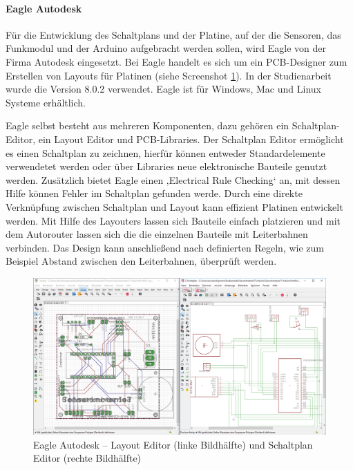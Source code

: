 \paragraph{Eagle Autodesk} Für die Entwicklung des Schaltplans und der Platine, auf der die Sensoren,  das Funkmodul und der Arduino aufgebracht werden sollen, wird Eagle von der Firma Autodesk eingesetzt.  Bei Eagle handelt es sich um ein \ac{PCB}-Designer zum Erstellen von Layouts für Platinen (siehe Screenshot \ref{img:EagleAutodesk}). In der Studienarbeit wurde die Version 8.0.2 verwendet. Eagle ist für Windows, Mac und Linux Systeme erhältlich. 

Eagle selbst besteht aus mehreren Komponenten, dazu gehören ein Schaltplan-Editor, ein Layout Editor und \ac{PCB}-Libraries. Der Schaltplan Editor ermöglicht es einen Schaltplan zu zeichnen, hierfür können entweder Standardelemente verwendetet werden oder über Libraries neue elektronische Bauteile genutzt werden. Zusätzlich bietet Eagle einen ‚Electrical Rule Checking‘ an, mit dessen Hilfe können Fehler im Schaltplan gefunden werde. Durch eine direkte Verknüpfung zwischen Schaltplan und Layout kann effizient Platinen entwickelt werden. Mit Hilfe des Layouters lassen sich Bauteile einfach platzieren und mit dem Autorouter lassen sich die die einzelnen Bauteile mit Leiterbahnen verbinden. Das Design kann anschließend nach definierten Regeln, wie zum Beispiel Abstand zwischen den Leiterbahnen, überprüft werden. 
\begin{figure}
	\centering
	\includegraphics[width=1\textwidth]{bilder/Eagle}
	\caption[Eagle Autodesk – Layout Editor und Schaltplan Editor]{Eagle Autodesk – Layout Editor (linke Bildhälfte) und Schaltplan Editor (rechte Bildhälfte)}
	\label{img:EagleAutodesk}
\end{figure}
